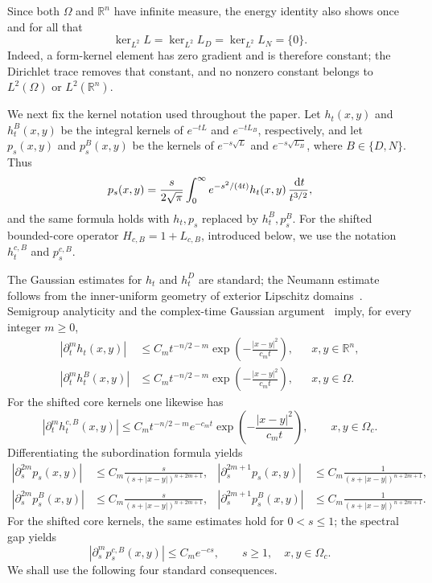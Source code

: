\documentclass[12pt]{amsart}
\newcommand\R{\mathbb{R}}
\newcommand\dd{\,{\rm d}}
\theoremstyle{remark}
\begin{document}
Since both \(\Omega\) and \(\R^n\) have infinite measure, the energy identity also
shows once and for all that
\begin{equation}\label{eq:exterior-L2-kernels}
 \ker_{L^2}L=\ker_{L^2}L_D=\ker_{L^2}L_N=\{0\}.
\end{equation}
Indeed, a form-kernel element has zero gradient and is therefore constant;
the Dirichlet trace removes that constant, and no nonzero constant belongs
to $L^2(\Omega)$ or $L^2(\mathbb R^n)$.

We next fix the kernel notation used throughout the paper.  Let
$h_t(x,y)$ and $h_t^B(x,y)$ be the integral kernels of $e^{-tL}$ and
$e^{-tL_B}$, respectively, and let $p_s(x,y)$ and $p_s^B(x,y)$ be the
kernels of $e^{-s\sqrt L}$ and $e^{-s\sqrt{L_B}}$, where
$B\in\{D,N\}$.  Thus
\[
 p_s(x,y)=\frac{s}{2\sqrt\pi}\int_0^\infty
 e^{-s^2/(4t)}h_t(x,y)\,\frac{\dd t}{t^{3/2}},
\]
and the same formula holds with $h_t,p_s$ replaced by $h_t^B,p_s^B$.
For the shifted bounded-core operator $H_{c,B}=1+L_{c,B}$, introduced
below, we use the notation $h_t^{c,B}$ and $p_s^{c,B}$.

The Gaussian estimates for $h_t$ and $h_t^D$ are standard; the Neumann
estimate follows from the inner-uniform geometry of exterior Lipschitz
domains~\cite{GyryaSaloffCoste}.  Semigroup analyticity and the
complex-time Gaussian argument~\cite{CoulhonSikora08} imply, for every
integer $m\ge0$,
\begin{align*}
 |\partial_t^m h_t(x,y)|
 &\le C_m t^{-n/2-m}
       \exp\!\left(-\frac{|x-y|^2}{c_mt}\right),
 &&x,y\in\R^n,\\
 |\partial_t^m h_t^B(x,y)|
 &\le C_m t^{-n/2-m}
       \exp\!\left(-\frac{|x-y|^2}{c_mt}\right),
 &&x,y\in\Omega.
\end{align*}
For the shifted core kernels one likewise has
\[
 |\partial_t^m h_t^{c,B}(x,y)|
 \le C_m t^{-n/2-m}e^{-c_mt}
       \exp\!\left(-\frac{|x-y|^2}{c_mt}\right),
 \qquad x,y\in\Omega_c.
\]
Differentiating the subordination formula yields
\begin{align*}
 |\partial_s^{2m}p_s(x,y)|
 &\le C_m\frac{s}{(s+|x-y|)^{n+2m+1}},&
 |\partial_s^{2m+1}p_s(x,y)|
 &\le C_m\frac{1}{(s+|x-y|)^{n+2m+1}},\\
 |\partial_s^{2m}p_s^B(x,y)|
 &\le C_m\frac{s}{(s+|x-y|)^{n+2m+1}},&
 |\partial_s^{2m+1}p_s^B(x,y)|
 &\le C_m\frac{1}{(s+|x-y|)^{n+2m+1}}.
\end{align*}
For the shifted core kernels, the same estimates hold for $0<s\le1$;
the spectral gap yields
\[
 |\partial_s^m p_s^{c,B}(x,y)|\le C_m e^{-c s},
  \qquad s\ge1,\quad x,y\in\Omega_c.
\]
We shall use the following four standard consequences.
\end{document}
